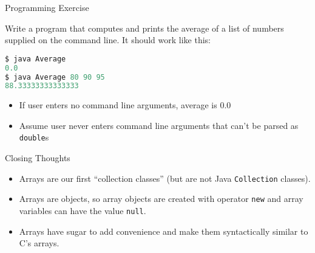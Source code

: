 \documentclass{beamer}
\begin{document}





\begin{frame}[fragile]{Programming Exercise}


Write a program that computes and prints the average of a list of numbers supplied on the command line.  It should work like this:
\begin{lstlisting}[language=Java]
$ java Average
0.0
$ java Average 80 90 95
88.33333333333333
\end{lstlisting}

\begin{itemize}
\item If user enters no command line arguments, average is 0.0
\item Assume user never enters command line arguments that can't be parsed as {\tt double}s
\end{itemize}


\end{frame}


\begin{frame}[fragile]{Closing Thoughts}

\begin{itemize}
\item Arrays are our first ``collection classes'' (but are not Java {\tt Collection} classes).
\item Arrays are objects, so array objects are created with operator {\tt new} and array variables can have the value {\tt null}.
\item Arrays have sugar to add convenience and make them syntactically similar to C's arrays.
\end{itemize}


\end{frame}
\end{document}
